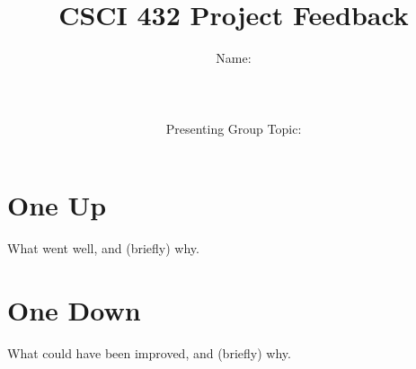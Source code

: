 \documentclass{article}
\title{CSCI 432 Project Feedback}
\author{Name: \rule{3in}{0.15mm} \\~\\
    Presenting Group Topic: \rule{3in}{0.15mm} }
\date{date: \rule{3in}{0.15mm} }
\begin{document}
\maketitle

\noindent
\section*{One Up}

What went well, and (briefly) why.

\vspace{2in}

\section*{One Down}

What could have been improved, and (briefly) why.
\end{document}
